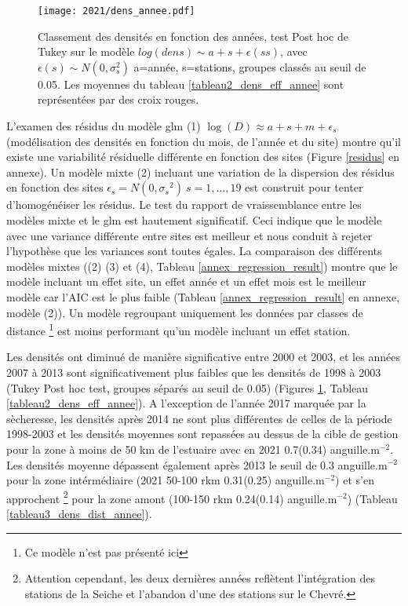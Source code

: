 \documentclass[10pt,twocolumn,titlepage,twoside]{article}\usepackage[]{graphicx}\usepackage[]{color}
\begin{document}
\begin{figure}[htbp]
\centering
 \texttt{[image: 2021/dens\_annee.pdf]} 
\caption[Tendance des densités modèle]{Classement des densités en fonction des
années, test Post hoc de Tukey sur le modèle $log(dens) \sim a +s +
\epsilon(ss)$, avec $\epsilon(s) \sim N(0,\sigma_s^2)$ a=année, s=stations,
groupes classés au seuil de 0.05. Les moyennes du tableau
\ref{tableau2_dens_eff_annee} sont représentées par des croix rouges.
}
\label{dens_annee}
\end{figure}

L'examen des résidus du modèle glm (1) $\log
(D){\approx}a+s+m+\epsilon_s$ (modélisation des densités en fonction du mois, de
l'année et du site) montre qu'il existe une variabilité résiduelle différente en fonction des sites (Figure \ref{residus} en annexe).  Un
modèle mixte (2) incluant une variation de la dispersion des résidus en fonction
des sites $\epsilon_s=N(0,{\sigma_{s}}^2) ~s=1,\dots,19$
\citep{zuur_mixed_2009} est construit pour tenter d'homogénéiser les résidus. Le
test du rapport de vraissemblance entre les modèles mixte et le glm est
hautement significatif. Ceci indique que le modèle avec une variance différente entre
sites est meilleur et nous conduit à rejeter l'hypothèse que les variances sont
toutes égales.
La comparaison des différents modèles mixtes ((2) (3) et (4), Tableau
\ref{annex_regression_result}) montre
que le modèle incluant un effet site, un effet année et un effet mois est le
meilleur modèle car l'AIC est le plus faible (Tableau
\ref{annex_regression_result} en annexe, modèle (2)). Un modèle regroupant
uniquement les données par classes de distance \footnote{Ce modèle n'est pas présenté ici} est moins performant
qu'un modèle incluant un effet station.

Les densités ont diminué de manière
significative entre 2000 et 2003, et les années 2007 à 2013
sont significativement plus faibles que les densités de 1998 à 2003 (Tukey
Post hoc test, groupes séparés au seuil de 0.05) (Figures \ref{dens_annee},
Tableau \ref{tableau2_dens_eff_annee}).
A l'exception de l'année 2017 marquée par la sècheresse, les densités après 2014
ne sont plus différentes de celles de la période 1998-2003 et les densités moyennes sont
repassées au dessus de la cible de gestion pour la zone à moins de 50 km de
l'estuaire avec en 2021 0.7(0.34) anguille.m$^{-2}$. Les
densités moyenne dépassent également après 2013 le seuil de 0.3
anguille.m$^{-2}$ pour la zone intérmédiaire (2021 50-100 rkm 0.31(0.25)
anguille.m$^{-2}$) et s'en approchent \footnote{Attention cependant, les deux
dernières années reflètent l'intégration des stations de la Seiche et l'abandon d'une des
stations sur le Chevré.} pour la zone amont (100-150 rkm
0.24(0.14) anguille.m$^{-2}$) (Tableau \ref{tableau3_dens_dist_annee}). 
\end{document}
